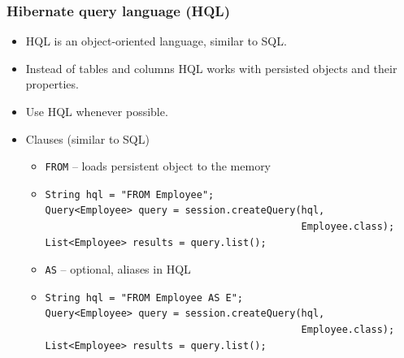 \documentclass[10pt,xcolor=pdflatex]{beamer}
\begin{document}
\begin{frame}[fragile]\frametitle{Hibernate query language (HQL)}
	\begin{itemize}
		\item HQL is an object-oriented language, similar to SQL.
		\item Instead of tables and columns HQL works with persisted objects and their properties.
		\item Use HQL whenever possible.
		\item Clauses (similar to SQL)
          \begin{itemize}
        	\item \texttt{FROM} -- loads persistent object to the memory
            \item[]
            	\lstset{language=Java}
                \footnotesize
                \begin{lstlisting}
String hql = "FROM Employee";
Query<Employee> query = session.createQuery(hql, 
                                            Employee.class);
List<Employee> results = query.list();
                \end{lstlisting}
                \normalsize
            \item \texttt{AS} -- optional, aliases in HQL
            \item[]
            	\lstset{language=Java}
                \footnotesize
                \begin{lstlisting}
String hql = "FROM Employee AS E";
Query<Employee> query = session.createQuery(hql, 
                                            Employee.class);
List<Employee> results = query.list();
                \end{lstlisting}
                \normalsize
          \end{itemize}
	\end{itemize}
\end{frame}
\end{document}
